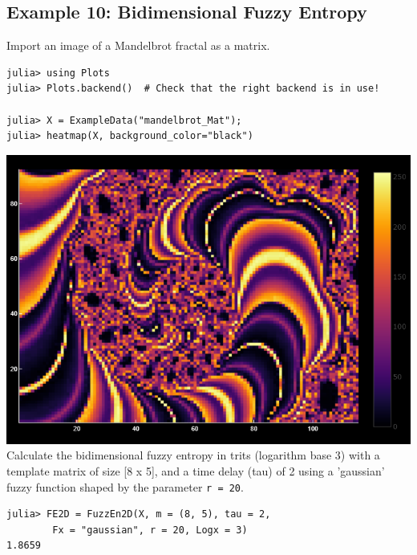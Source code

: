 \documentclass[12pt, a4paper, titlepage, openany]{book}
\begin{document}
\subsection{\normalsize Example 10: \hspace{15mm} Bidimensional Fuzzy Entropy}
\noindent Import an image of a Mandelbrot fractal as a matrix.
\begin{verbatim}
julia> using Plots
julia> Plots.backend()  # Check that the right backend is in use! 

julia> X = ExampleData("mandelbrot_Mat");
julia> heatmap(X, background_color="black")
\end{verbatim}
\includegraphics[scale=.5]{mandelbrotjl.png}\newline \newline
Calculate the bidimensional fuzzy entropy in trits (logarithm base 3) with a template matrix of size [8 x 5], and a time delay (tau) of 2  using a 'gaussian' fuzzy function shaped by the parameter \texttt{r = 20}.
\begin{verbatim}
julia> FE2D = FuzzEn2D(X, m = (8, 5), tau = 2, 
		Fx = "gaussian", r = 20, Logx = 3)
1.8659
\end{verbatim}
\end{document}
